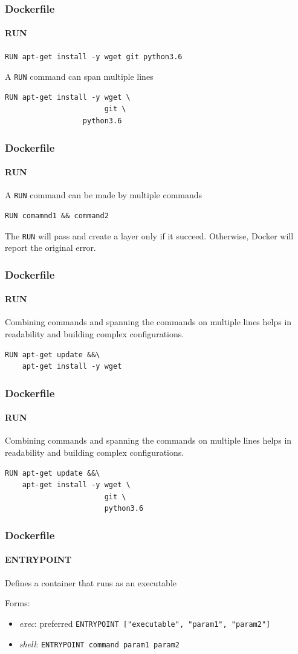\begin{frame}[fragile]
\frametitle{Dockerfile}
\framesubtitle{RUN}

\begin{lstlisting}
RUN apt-get install -y wget git python3.6
\end{lstlisting}

A \lstinline!RUN! command can span multiple lines


\begin{lstlisting}
RUN apt-get install -y wget \
                       git \
				  python3.6
\end{lstlisting}
\end{frame}

\begin{frame}[fragile]
\frametitle{Dockerfile}
\framesubtitle{RUN}

A \lstinline!RUN! command can be made by multiple commands

\begin{lstlisting}
RUN comamnd1 && command2
\end{lstlisting}

The \lstinline!RUN! will pass and create a layer only if it succeed. Otherwise, Docker will report the original error.
\end{frame}

\begin{frame}[fragile]
\frametitle{Dockerfile}
\framesubtitle{RUN}

Combining commands and spanning the commands on multiple lines helps in readability and building complex configurations.

\begin{lstlisting}
RUN apt-get update &&\
    apt-get install -y wget 
\end{lstlisting}
\end{frame}

\begin{frame}[fragile]
\frametitle{Dockerfile}
\framesubtitle{RUN}

Combining commands and spanning the commands on multiple lines helps in readability and building complex configurations.

\begin{lstlisting}
RUN apt-get update &&\
    apt-get install -y wget \
	                   git \
	                   python3.6
\end{lstlisting}
\end{frame}

\begin{frame}[fragile]
\frametitle{Dockerfile}
\framesubtitle{ENTRYPOINT}
Defines a container that runs as an executable

Forms:

\begin{itemize}
\item \textit{exec}: preferred \lstinline!ENTRYPOINT ["executable", "param1", "param2"]!

\item \textit{shell}:  \lstinline!ENTRYPOINT command param1 param2!
\end{itemize}
\end{frame}


